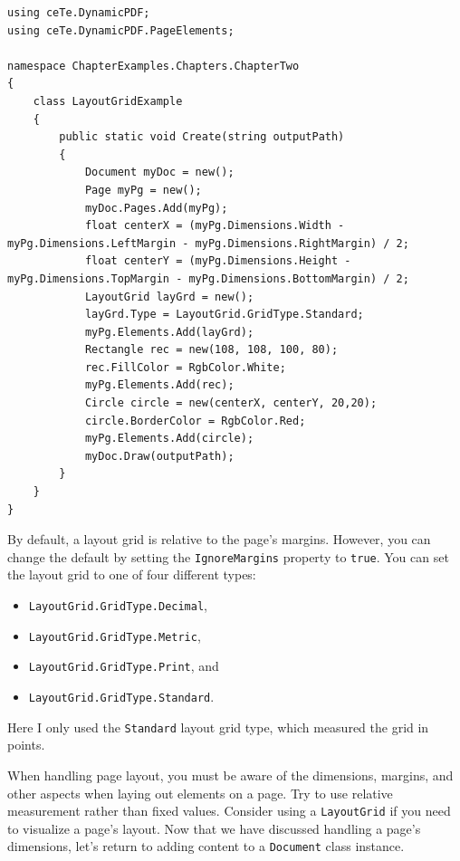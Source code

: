 \documentclass[american,letterpaper]{tufte-book}
\numberwithin{equation}{section}
\numberwithin{figure}{section}
\begin{document}
\bgroup{}
\begin{lstlisting}[caption={Using the LayoutGrid class for development.},label={lis:ly-grid-Example-using-the},basicstyle={\small\ttfamily},breaklines=true]
using ceTe.DynamicPDF;
using ceTe.DynamicPDF.PageElements;

namespace ChapterExamples.Chapters.ChapterTwo
{
    class LayoutGridExample
    {
        public static void Create(string outputPath)
        {
            Document myDoc = new();
            Page myPg = new();
            myDoc.Pages.Add(myPg);
            float centerX = (myPg.Dimensions.Width - myPg.Dimensions.LeftMargin - myPg.Dimensions.RightMargin) / 2;
            float centerY = (myPg.Dimensions.Height - myPg.Dimensions.TopMargin - myPg.Dimensions.BottomMargin) / 2;
            LayoutGrid layGrd = new();
            layGrd.Type = LayoutGrid.GridType.Standard;
            myPg.Elements.Add(layGrd);
            Rectangle rec = new(108, 108, 100, 80);
            rec.FillColor = RgbColor.White;
            myPg.Elements.Add(rec);
            Circle circle = new(centerX, centerY, 20,20);
            circle.BorderColor = RgbColor.Red;
            myPg.Elements.Add(circle);         
            myDoc.Draw(outputPath);
        }
    }
}
\end{lstlisting}
\leavevmode\egroup

By default, a layout grid is relative to the page's margins. However,
you can change the default by setting the \texttt{IgnoreMargins} property
to \texttt{true}. You can set the layout grid to one of four different
types:
\begin{itemize}
\item \texttt{LayoutGrid.GridType.Decimal},
\item \texttt{LayoutGrid.GridType.Metric},
\item \texttt{LayoutGrid.GridType.Print}, and
\item \texttt{LayoutGrid.GridType.Standard}.
\end{itemize}
Here I only used the \texttt{Standard} layout grid type, which measured
the grid in points. 

When handling page layout, you must be aware of the dimensions, margins, and other aspects when laying out elements on a page. Try to use relative measurement rather than fixed values. Consider using a \texttt{LayoutGrid} if you need to visualize a page's layout. Now that we have discussed handling a page's dimensions, let's return to adding content to a \texttt{Document} class instance.
\end{document}
